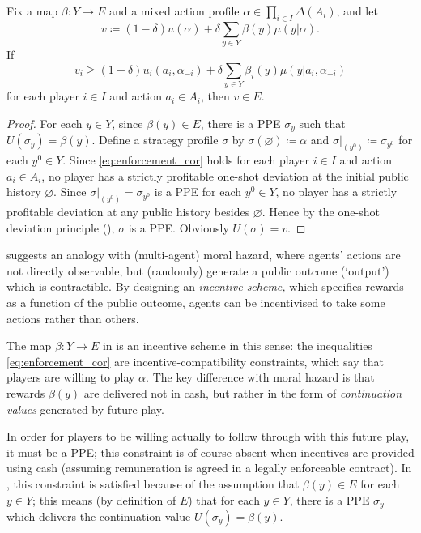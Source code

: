 \begin{corollary}
	\label{corollary:enforcement}
	Fix a map $\beta : Y \to E$ and a mixed action profile $\alpha \in \prod_{i \in I} \Delta(A_i)$, and let
	\begin{equation*}
		v \coloneqq (1-\delta) u(\alpha) + \delta \sum_{y \in Y} \beta(y) \mu(y|\alpha) .
	\end{equation*}
	If
	\begin{equation}
		v_i \geq (1-\delta) u_i(a_i,\alpha_{-i}) + \delta \sum_{y \in Y} \beta_i(y) \mu(y|a_i,\alpha_{-i})
		\label{eq:enforcement_cor}
	\end{equation}
	for each player $i \in I$ and action $a_i \in A_i$, then $v \in E$.
\end{corollary}

\begin{proof}
	For each $y \in Y$, since $\beta(y) \in E$, there is a PPE $\sigma_y$ such that $U(\sigma_y) = \beta(y)$. Define a strategy profile $\sigma$ by $\sigma(\varnothing) \coloneqq \alpha$ and $\sigma|_{\left(y^0\right)} \coloneqq \sigma_{y^0}$ for each $y^0 \in Y$. Since \eqref{eq:enforcement_cor} holds for each player $i \in I$ and action $a_i \in A_i$, no player has a strictly profitable one-shot deviation at the initial public history $\varnothing$. Since $\sigma|_{\left(y^0\right)} = \sigma_{y^0}$ is a PPE for each $y^0 \in Y$, no player has a strictly profitable deviation at any public history besides $\varnothing$. Hence by the one-shot deviation principle (), $\sigma$ is a PPE. Obviously $U(\sigma)=v$.
\end{proof}

 suggests an analogy with (multi-agent) moral hazard, where agents' actions are not directly observable, but (randomly) generate a public outcome (`output') which is contractible. By designing an \emph{incentive scheme,} which specifies rewards as a function of the public outcome, agents can be incentivised to take some actions rather than others.

The map $\beta : Y \to E$ in  is an incentive scheme in this sense: the inequalities \eqref{eq:enforcement_cor} are incentive-compatibility constraints, which say that players are willing to play $\alpha$. The key difference with moral hazard is that rewards $\beta(y)$ are delivered not in cash, but rather in the form of \emph{continuation values} generated by future play.

In order for players to be willing actually to follow through with this future play, it must be a PPE; this constraint is of course absent when incentives are provided using cash (assuming remuneration is agreed in a legally enforceable contract). In , this constraint is satisfied because of the assumption that $\beta(y) \in E$ for each $y \in Y$; this means (by definition of $E$) that for each $y \in Y$, there is a PPE $\sigma_y$ which delivers the continuation value $U(\sigma_y) = \beta(y)$.

